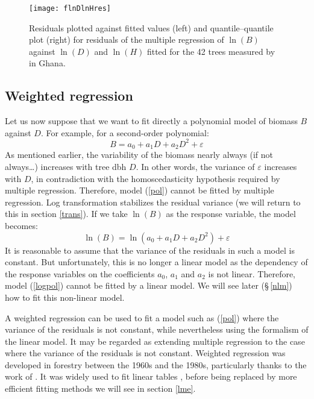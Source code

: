 \begin{figure}[htb]
\texttt{[image: flnDlnHres]}
\caption[Residuals plotted against fitted values and quantile--quantile plot for residuals of the multiple regression of $\ln(B)$ against $\ln(D)$ and $\ln(H)$ fitted for the 42 trees measured by \citet{henry10} in Ghana]{Residuals plotted against fitted values (left) and quantile--quantile plot (right) for residuals of the multiple regression of $\ln(B)$ against $\ln(D)$ and $\ln(H)$ fitted for the 42 trees measured by \citet{henry10} in Ghana.\label{flnDHres}}
\end{figure}


\subsection{Weighted regression\label{pond}}

Let us now suppose that we want to fit directly a polynomial model of biomass $B$ against $D$. For example, for a second-order polynomial:
\begin{equation}
B=a_0+a_1D+a_2D^2+\varepsilon\label{pol}
\end{equation}
As mentioned earlier, the variability of the biomass nearly always (if not always\ldots) increases with tree dbh $D$. In other words, the variance of $\varepsilon$ increases with $D$, in contradiction with the homoscedasticity hypothesis required by multiple regression. Therefore, model (\ref{pol}) cannot be fitted by multiple regression. Log transformation stabilizes the residual variance (we will return to this in section \ref{trans}). If we take $\ln(B)$ as the response variable, the model becomes:
\begin{equation}
\ln(B)=\ln(a_0+a_1D+a_2D^2)+\varepsilon\label{logpol}
\end{equation}
It is reasonable to assume that the variance of the residuals in such a model is constant. But unfortunately, this is no longer a linear model as the dependency of the response variables on the coefficients $a_0$, $a_1$ and $a_2$ is not linear. Therefore, model (\ref{logpol}) cannot be fitted by a linear model. We will see later (\S\,\ref{nlm}) how to fit this non-linear model.

A weighted regression can be used to fit a model such as (\ref{pol}) where the variance of the residuals is not constant, while nevertheless using the formalism of the linear model. It may be regarded as extending multiple regression to the case where the variance of the residuals is not constant. Weighted regression was developed in forestry between the 1960s and the 1980s, particularly thanks to the work of \citet{cunia64,cunia87b}. It was widely used to fit linear tables \citep{whraton87,brown89,parresol99}, before being replaced by more efficient fitting methods we will see in section \ref{lme}.


